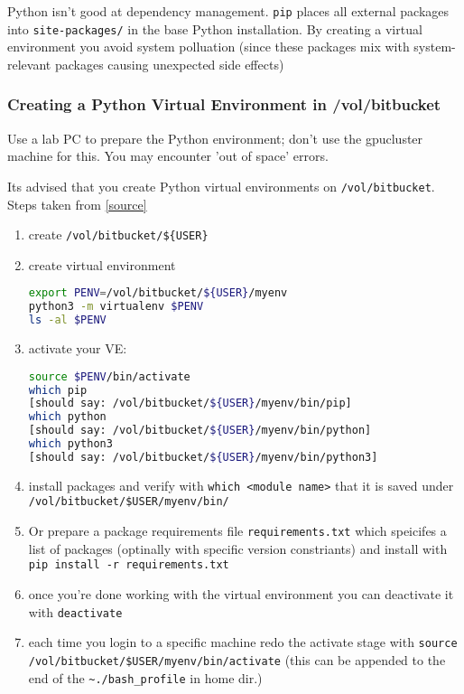 \documentclass[11pt]{article}
\begin{document}
Python isn't good at dependency management. \texttt{pip} places all external packages into \texttt{site-packages/} in the base Python installation. By creating a virtual environment you avoid system polluation (since these packages mix with system-relevant packages causing unexpected side effects)

\subsubsection{Creating a Python Virtual Environment in /vol/bitbucket}

\begin{warning}
    Use a lab PC to prepare the Python environment; don't use the gpucluster machine for this. You may encounter 'out of space' errors.
\end{warning}

Its advised that you create Python virtual environments on \texttt{/vol/bitbucket}. Steps taken from \href{https://www.imperial.ac.uk/computing/people/csg/guides/python/virtual-environment/#d.en.1235829}{[source]}
\begin{enumerate}
    \item create \verb|/vol/bitbucket/${USER}|
    \item create virtual environment
          \begin{lstlisting}[language=sh]
export PENV=/vol/bitbucket/${USER}/myenv
python3 -m virtualenv $PENV
ls -al $PENV
          \end{lstlisting}
    \item activate your VE:
          \begin{lstlisting}[language=sh]
source $PENV/bin/activate
which pip
[should say: /vol/bitbucket/${USER}/myenv/bin/pip]
which python
[should say: /vol/bitbucket/${USER}/myenv/bin/python]
which python3
[should say: /vol/bitbucket/${USER}/myenv/bin/python3]
          \end{lstlisting}
    \item install packages and verify with \texttt{which <module name>} that it is saved under \texttt{/vol/bitbucket/\${USER}/myenv/bin/}
    \item Or prepare a package requirements file \texttt{requirements.txt} which speicifes a list of packages (optinally with specific version constriants) and install with \texttt{pip install -r requirements.txt}
    \item once you're done working with the virtual environment you can deactivate it with \texttt{deactivate}
    \item each time you login to a specific machine redo the activate stage with \texttt{source /vol/bitbucket/\${USER}/myenv/bin/activate} (this can be appended to the end of the \verb|~./bash_profile| in home dir.)
\end{enumerate}
\end{document}
